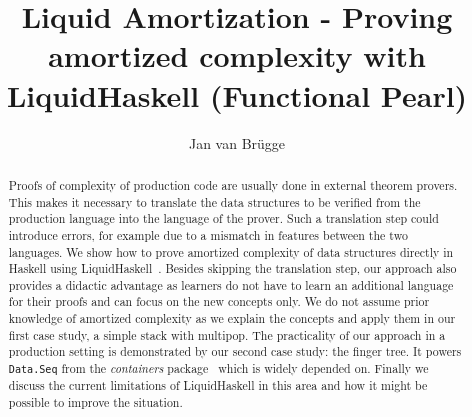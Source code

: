\documentclass[sigplan,screen]{acmart}
\begin{document}
\title{Liquid Amortization - Proving amortized complexity with LiquidHaskell (Functional Pearl)}

\author{Jan van Brügge}


\begin{abstract}
Proofs of complexity of production code are usually done in external theorem provers. This makes it necessary to translate the data structures to be verified from the production language into the language of the prover. Such a translation step could introduce errors, for example due to a mismatch in features between the two languages. We show how to prove amortized complexity of data structures directly in Haskell using LiquidHaskell~\cite{liquidhaskell}. Besides skipping the translation step, our approach also provides a didactic advantage as learners do not have to learn an additional language for their proofs and can focus on the new concepts only. We do not assume prior knowledge of amortized complexity as we explain the concepts and apply them in our first case study, a simple stack with multipop. The practicality of our approach in a production setting is demonstrated by our second case study: the finger tree. It powers \texttt{Data.Seq} from the \textit{containers} package~\cite{containers} which is widely depended on. Finally we discuss the current limitations of LiquidHaskell in this area and how it might be possible to improve the situation.
\end{abstract}
\end{document}
